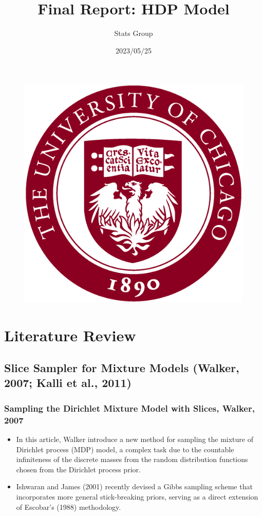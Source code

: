 \documentclass{beamer}
\author{Stats Group}
\title{Final Report: HDP Model}
\institute{Department of Statistics, The University of Chicago}
\date{2023/05/25}
\begin{document}
\begin{frame}
    \titlepage
    \begin{figure}[htpb]
        \begin{center}
            \includegraphics[width=0.25\linewidth]{pic/UChicago_Seal_2Color_MaroonBorder_WhiteFill_CMYK.eps}
        \end{center}
    \end{figure}
\end{frame}

\begin{frame}
    \tableofcontents[sectionstyle=show,subsectionstyle=show,subsubsectionstyle=show]
\end{frame}


\section{Literature Review}

\subsection{\small{Slice Sampler for Mixture Models (Walker, 2007; Kalli et al., 2011)}}
\begin{frame}
    \frametitle{Sampling the Dirichlet Mixture Model with Slices, Walker, 2007}
    \begin{itemize}
        \item In this article, Walker introduce a new method for sampling the mixture of Dirichlet process (MDP) model, a complex task due to the countable infiniteness of the discrete masses from the random distribution functions chosen from the Dirichlet process prior.
        \item Ishwaran and James (2001) recently devised a Gibbs sampling scheme that incorporates more general stick-breaking priors, serving as a direct extension of Escobar's (1988) methodology.
    \end{itemize}
    
\end{frame}
\end{document}
